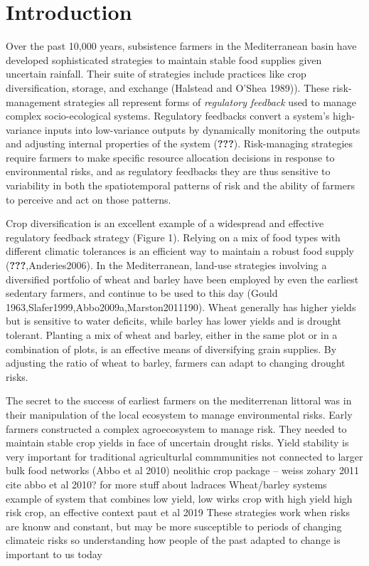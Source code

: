 \documentclass[smallextended]{svjour3}       %
\begin{document}
\def\spacingset#1{\renewcommand{\baselinestretch}%
{#1}\small\normalsize} \spacingset{1}


\hypertarget{intro}{%
\section{Introduction}\label{intro}}

Over the past 10,000 years, subsistence farmers in the Mediterranean
basin have developed sophisticated strategies to maintain stable food
supplies given uncertain rainfall. Their suite of strategies include
practices like crop diversification, storage, and exchange (Halstead and
O'Shea 1989)). These risk-management strategies all represent forms of
\emph{regulatory feedback} used to manage complex socio-ecological
systems. Regulatory feedbacks convert a system's high-variance inputs
into low-variance outputs by dynamically monitoring the outputs and
adjusting internal properties of the system ({\textbf{???}}).
Risk-managing strategies require farmers to make specific resource
allocation decisions in response to environmental risks, and as
regulatory feedbacks they are thus sensitive to variability in both the
spatiotemporal patterns of risk and the ability of farmers to perceive
and act on those patterns.

Crop diversification is an excellent example of a widespread and
effective regulatory feedback strategy (Figure 1). Relying on a mix of
food types with different climatic tolerances is an efficient way to
maintain a robust food supply ({\textbf{???}},Anderies2006). In the
Mediterranean, land-use strategies involving a diversified portfolio of
wheat and barley have been employed by even the earliest sedentary
farmers, and continue to be used to this day (Gould
1963,Slafer1999,Abbo2009a,Marston2011190). Wheat generally has higher
yields but is sensitive to water deficits, while barley has lower yields
and is drought tolerant. Planting a mix of wheat and barley, either in
the same plot or in a combination of plots, is an effective means of
diversifying grain supplies. By adjusting the ratio of wheat to barley,
farmers can adapt to changing drought risks.

The secret to the success of earliest farmers on the mediterrenan
littoral was in their manipulation of the local ecosystem to manage
environmental risks. Early farmers constructed a complex agroecosystem
to manage risk. They needed to maintain stable crop yields in face of
uncertain drought risks. Yield stability is very important for
traditional agriculturlal commmunities not connected to larger bulk food
networks (Abbo et al 2010) neolithic crop package -- weiss zohary 2011
cite abbo et al 2010? for more stuff about ladraces Wheat/barley systems
example of system that combines low yield, low wirks crop with high
yield high risk crop, an effective context paut et al 2019 These
strategies work when risks are knonw and constant, but may be more
susceptible to periods of changing climateic risks so understanding how
people of the past adapted to change is important to us today
\end{document}
